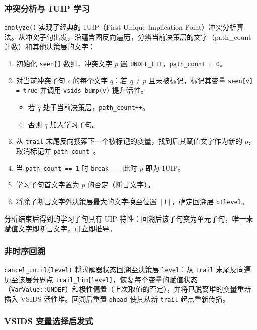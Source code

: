 \documentclass[12pt,a4paper]{article}
\begin{document}
\subsubsection{冲突分析与 1UIP 学习}

\texttt{analyze()} 实现了经典的 1UIP（First Unique Implication Point）冲突分析算法。从冲突子句出发，沿蕴含图反向遍历，分辨当前决策层的文字（path\_count 计数）和其他决策层的文字：

\begin{enumerate}[label=(\arabic*)]
    \item 初始化 \texttt{seen[]} 数组，冲突文字 $p$ 置 \texttt{UNDEF\_LIT}，\texttt{path\_count = 0}。
    \item 对当前冲突子句 $c$ 的每个文字 $q$：若 $q \neq p$ 且未被标记，标记其变量 \texttt{seen[v] = true} 并调用 \texttt{vsids\_bump(v)} 提升活性。
    \begin{itemize}
        \item 若 $q$ 处于当前决策层，\texttt{path\_count++}。
        \item 否则 $q$ 加入学习子句。
    \end{itemize}
    \item 从 \texttt{trail} 末尾反向搜索下一个被标记的变量，找到后其赋值文字作为新的 $p$，取消标记并 \texttt{path\_count--}。
    \item 当 \texttt{path\_count == 1} 时 \texttt{break}——此时 $p$ 即为 1UIP。
    \item 学习子句首文字置为 $p$ 的否定（断言文字）。
    \item 将除了断言文字外决策层最大的文字换至位置 $[1]$，确定回溯层 \texttt{btlevel}。
\end{enumerate}

分析结束后得到的学习子句具有 UIP 特性：回溯后该子句变为单元子句，唯一未赋值文字即断言文字，可立即推导。

\subsubsection{非时序回溯}

\texttt{cancel\_until(level)} 将求解器状态回溯至决策层 \texttt{level}：从 \texttt{trail} 末尾反向遍历至该层分界点 \texttt{trail\_lim[level]}，恢复每个变量的赋值状态（\texttt{VarValue::UNDEF}）和极性偏置（上次取值的否定），并将已脱离堆的变量重新插入 VSIDS 活性堆。回溯后重置 \texttt{qhead} 使其从新 \texttt{trail} 起点重新传播。

\subsubsection{VSIDS 变量选择启发式}
\end{document}
